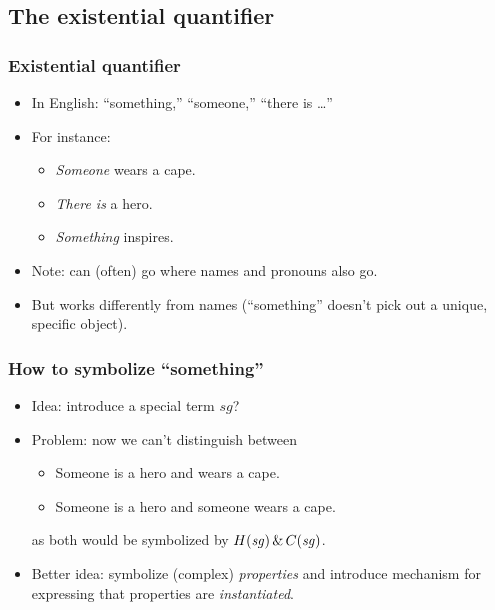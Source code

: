 \subsection{The existential quantifier}

\begin{frame}
\frametitle{Existential quantifier}

\begin{itemize}[<+->]
  \item In English: ``something,'' ``someone,'' ``there is \dots''
  \item For instance:
  \begin{itemize}[<+->]
    \item \emph{Someone} wears a cape.
    \item \emph{There is} a hero.
    \item \emph{Something} inspires.
  \end{itemize}
  \item Note: can (often) go where names and pronouns also go.
  \item But works differently from names (``something'' doesn't pick
  out a unique, specific object).
\end{itemize}
\end{frame}

\begin{frame}
  \frametitle{How to symbolize ``something''}

  \begin{itemize}[<+->]
    \item Idea: introduce a special term $\mathit{sg}$?
    \item Problem: now we can't distinguish between
    \begin{itemize}[<+->]
      \item Someone is a hero and wears a cape.
      \item Someone is a hero and someone wears a cape.
    \end{itemize}
    as both would be symbolized by $H(\mathit{sg}) \,\&\,
    C(\mathit{sg})$.
    \item Better idea: symbolize (complex) \emph{properties} and introduce
    mechanism for expressing that properties are \emph{instantiated}.
  \end{itemize}
\end{frame}


